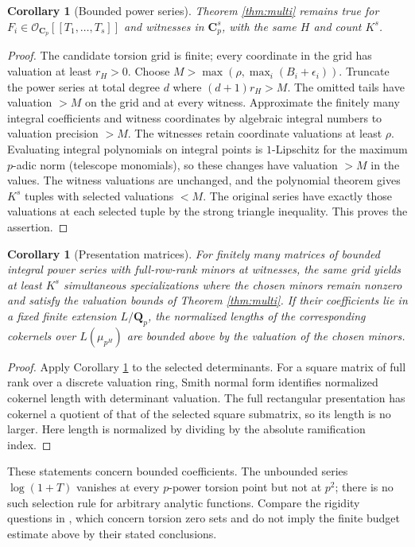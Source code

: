 \documentclass[11pt]{article}
\newtheorem{corollary}[theorem]{Corollary}
\theoremstyle{remark}\newtheorem{remark}[theorem]{Remark}
\newcommand{\Q}{\mathbf Q}\newcommand{\Z}{\mathbf Z}\newcommand{\C}{\mathbf C}\newcommand{\Ocal}{\mathcal O}\newcommand{\eps}{\varepsilon}\newcommand{\vp}{v_p}\newcommand{\rh}{r_h}\newcommand{\Gauss}{\mathsf G}\newcommand{\pbar}{\overline{\Q}_p}
\begin{document}
\begin{corollary}[Bounded power series]\label{cor:series}
Theorem \ref{thm:multi} remains true for
$F_i\in\Ocal_{\C_p}[[T_1,\ldots,T_s]]$ and witnesses in $\C_p^s$,
with the same $H$ and count $K^s$.
\end{corollary}
\begin{proof}
The candidate torsion grid is finite; every coordinate in the grid has
valuation at least $r_H>0$. Choose $M>\max(\rho,\max_i(B_i+\epsilon_i))$.
Truncate the power series at total degree $d$ where $(d+1)r_H>M$.
The omitted tails have valuation $>M$ on the grid and at every witness.
Approximate the finitely many integral coefficients and witness
coordinates by algebraic integral numbers to valuation precision $>M$.
The witnesses retain coordinate valuations at least $\rho$. Evaluating
integral polynomials on integral points is $1$-Lipschitz for the maximum
$p$-adic norm (telescope monomials), so these changes have valuation
$>M$ in the values. The witness valuations are unchanged, and the
polynomial theorem gives $K^s$ tuples with selected valuations $<M$.
The original series have exactly those valuations at each selected
tuple by the strong triangle inequality. This proves the assertion.
\end{proof}

\begin{corollary}[Presentation matrices]\label{cor:matrix}
For finitely many matrices of bounded integral power series with full-row-rank
minors at witnesses, the same grid yields at least $K^s$ simultaneous
specializations where the chosen minors remain nonzero and satisfy the
valuation bounds of Theorem \ref{thm:multi}. If their coefficients lie
in a fixed finite extension $L/\Q_p$, the normalized lengths of the
corresponding cokernels over $L(\mu_{p^H})$ are bounded above by the
valuation of the chosen minors.
\end{corollary}
\begin{proof}
Apply Corollary \ref{cor:series} to the selected determinants. For a
square matrix of full rank over a discrete valuation ring, Smith normal
form identifies normalized cokernel length with determinant valuation.
The full rectangular presentation has cokernel a quotient of that of
the selected square submatrix, so its length is no larger. Here length
is normalized by dividing by the absolute ramification index.
\end{proof}

These statements concern bounded coefficients. The unbounded series
$\log(1+T)$ vanishes at every $p$-power torsion point but not at $p^2$;
there is no such selection rule for arbitrary analytic functions. Compare
the rigidity questions in \cite{Serban18,Serban22}, which concern torsion
zero sets and do not imply the finite budget estimate above by their
stated conclusions.
\end{document}
